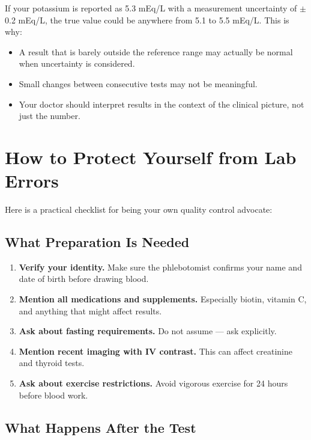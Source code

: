 If your potassium is reported as 5.3 mEq/L with a measurement uncertainty of $\pm$0.2 mEq/L, the true value could be anywhere from 5.1 to 5.5 mEq/L. This is why:

\begin{itemize}
    \item A result that is barely outside the reference range may actually be normal when uncertainty is considered.
    \item Small changes between consecutive tests may not be meaningful.
    \item Your doctor should interpret results in the context of the clinical picture, not just the number.
\end{itemize}

\clearpage
\section{How to Protect Yourself from Lab Errors}

Here is a practical checklist for being your own quality control advocate:

\subsection{What Preparation Is Needed}

\begin{enumerate}
    \item \textbf{Verify your identity.} Make sure the phlebotomist confirms your name and date of birth before drawing blood.
    \item \textbf{Mention all medications and supplements.} Especially biotin, vitamin C, and anything that might affect results.
    \item \textbf{Ask about fasting requirements.} Do not assume --- ask explicitly.
    \item \textbf{Mention recent imaging with IV contrast.} This can affect creatinine and thyroid tests.
    \item \textbf{Ask about exercise restrictions.} Avoid vigorous exercise for 24 hours before blood work.
\end{enumerate}

\subsection{What Happens After the Test}

